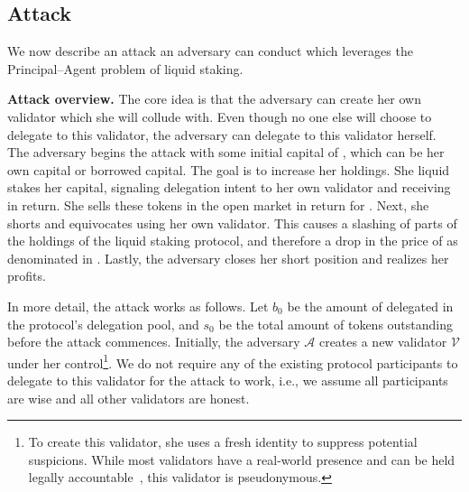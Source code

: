 \subsection{Attack}

We now describe an attack an adversary can conduct which leverages the
Principal--Agent problem of liquid staking.

\noindent
\textbf{Attack overview.}
The core idea is that the adversary can create her own validator
which she will collude with.
Even though no one else will choose to delegate to
this validator, the adversary can delegate to this validator herself.
The adversary begins the attack with some initial capital of \asset, which
can be her own capital or borrowed capital. The goal is to increase her
\asset holdings. She liquid stakes her capital, signaling delegation
intent to her own validator and receiving \stasset in return.
She sells these tokens in the open market in return for \asset.
Next, she shorts \stasset and equivocates using her own validator.
This causes a slashing of parts of the \asset holdings of the liquid
staking protocol, and therefore a drop in the price of \stasset
as denominated in \asset. Lastly, the adversary closes her short
position and realizes her profits.


In more detail, the attack works as follows.
Let $b_0$ be the amount of delegated \asset in the protocol's delegation pool,
and $s_0$ be the total amount of \stasset tokens outstanding
before the attack commences.
Initially,
the adversary $\mathcal{A}$ creates a new validator $\mathcal{V}$
under her control\footnote{To create this validator, she uses a fresh identity
to suppress potential suspicions. While most validators
have a real-world presence and can be held legally
accountable~\cite{liquid-staking-report}, this validator is pseudonymous.}.
We do not require any of the existing protocol participants to delegate
to this validator for the attack to work, i.e., we assume all participants
are wise and all other validators are honest.

